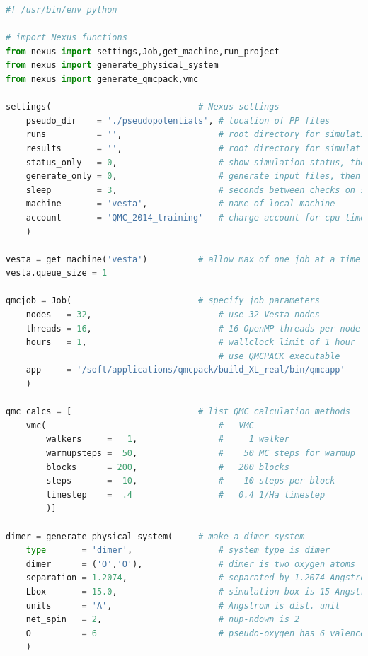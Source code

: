 \begin{lstlisting}[language=Python]
#! /usr/bin/env python

# import Nexus functions
from nexus import settings,Job,get_machine,run_project 
from nexus import generate_physical_system
from nexus import generate_qmcpack,vmc

settings(                             # Nexus settings
    pseudo_dir    = './pseudopotentials', # location of PP files
    runs          = '',                   # root directory for simulations
    results       = '',                   # root directory for simulation results
    status_only   = 0,                    # show simulation status, then exit
    generate_only = 0,                    # generate input files, then exit
    sleep         = 3,                    # seconds between checks on sim. progress
    machine       = 'vesta',              # name of local machine
    account       = 'QMC_2014_training'   # charge account for cpu time
    ) 

vesta = get_machine('vesta')          # allow max of one job at a time (lab only)
vesta.queue_size = 1

qmcjob = Job(                         # specify job parameters
    nodes   = 32,                         # use 32 Vesta nodes
    threads = 16,                         # 16 OpenMP threads per node (32 MPI tasks)
    hours   = 1,                          # wallclock limit of 1 hour
                                          # use QMCPACK executable
    app     = '/soft/applications/qmcpack/build_XL_real/bin/qmcapp'
    )

qmc_calcs = [                         # list QMC calculation methods
    vmc(                                  #   VMC
        walkers     =   1,                #     1 walker
        warmupsteps =  50,                #    50 MC steps for warmup
        blocks      = 200,                #   200 blocks
        steps       =  10,                #    10 steps per block
        timestep    =  .4                 #   0.4 1/Ha timestep
        )]

dimer = generate_physical_system(     # make a dimer system
    type       = 'dimer',                 # system type is dimer
    dimer      = ('O','O'),               # dimer is two oxygen atoms
    separation = 1.2074,                  # separated by 1.2074 Angstrom
    Lbox       = 15.0,                    # simulation box is 15 Angstrom 
    units      = 'A',                     # Angstrom is dist. unit
    net_spin   = 2,                       # nup-ndown is 2
    O          = 6                        # pseudo-oxygen has 6 valence el.
    )


\end{lstlisting}
